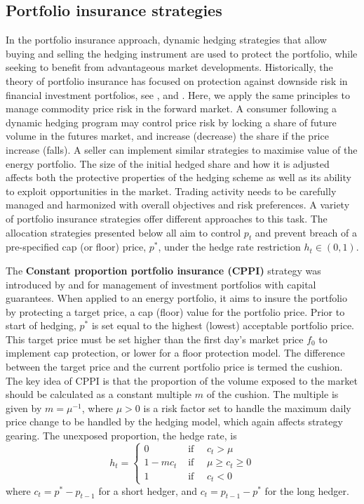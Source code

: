 \subsection{Portfolio insurance strategies}

In the portfolio insurance approach, dynamic hedging strategies that allow buying and selling the hedging instrument are used to protect the portfolio, while seeking to benefit from advantageous market developments. Historically, the theory of portfolio insurance has focused on protection against downside risk in financial investment portfolios, see \citet{leland1976evolution} , \citet{perold1988dynamic} and \citet{Leland1980WhoSB}. Here, we apply the same principles to manage commodity price risk in the forward market. A consumer following a dynamic hedging program may control price risk by locking a share of future volume in the futures market, and increase (decrease) the share if the price increase (falls). A seller can implement similar strategies to maximise value of the energy portfolio. The size of the initial hedged share and how it is adjusted affects both the protective properties of the hedging scheme as well as its ability to exploit opportunities in the market. Trading activity needs to be carefully managed and harmonized with overall objectives and risk preferences. A variety of portfolio insurance strategies offer different approaches to this task. The allocation strategies presented below all aim to control $p_t$ and prevent breach of a pre-specified cap (or floor) price, $p^*$, under the hedge rate restriction $h_t\in(0,1)$.


The \textbf{Constant proportion portfolio insurance (CPPI)} strategy was introduced by \citet{perold1986constant} and  \citet{black1987simplifying} for management of investment portfolios with capital guarantees. When applied to an energy portfolio, it aims to insure the portfolio by protecting a target price, a cap (floor) value for the portfolio price. Prior to start of hedging, $p^*$ is set equal to the highest (lowest) acceptable portfolio price. This target price must be set higher than the first day's market price $f_0$ to implement cap protection, or lower for a floor protection model. The difference between the target price and the current portfolio price is termed the cushion. The key idea of CPPI is that the proportion of the volume exposed to the market should be calculated as a constant multiple $m$ of the cushion. The multiple is given by $m=\mu^{-1}$, where $\mu>0$ is a risk factor set to handle the maximum daily price change to be handled by the hedging model, which again affects strategy gearing. The unexposed proportion, the hedge rate,  is
\begin{equation}
h_t =
\begin{cases}
0 & \text{ if } \quad c_t > \mu\\
1-m c_t  & \text{ if } \quad \mu \geq c_t\geq 0 \\
1 & \text{ if } \quad c_t< 0
\end{cases}
\end{equation}
where $c_t=p^*-p_{t-1}$ for a short hedger, and  $c_t=p_{t-1}-p^*$ for the long hedger. 

